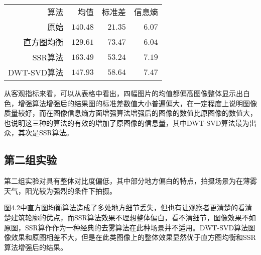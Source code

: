 \begin{table}[!htbp]
    \label{tab:sample}
    \centering
    \footnotesize%
    \setlength{\tabcolsep}{4pt}%
    \renewcommand{\arraystretch}{1.2}%
    \begin{tabular}{|r|r|r|r|}
	  \hline
        算法   			   & 均值 & 标准差 & 信息熵 \\
	   原始   			   & $140.48$ & $21.35$ & $6.07$ \\
        直方图均衡            & $129.61$ & $73.47$ & $6.04$ \\
        SSR算法			    & $163.49$ & $53.24$ & $7.19$ \\
        DWT-SVD算法       & $147.93$ & $58.64$ & $7.47$ \\
        \hline
    \end{tabular}
\end{table}


从客观指标来看，可以从表格中看出，四幅图片的均值都偏高图像整体显示出白色，增强算法增强后的结果图的标准差数值大小普遍偏大，在一定程度上说明图像质量较好，而在图像信息熵方面增强算法增强后的图像的数值比原图像的数值大，也说明这三种的算法的有效的增加了原图像的信息量，其中DWT-SVD算法最为出众，其次是SSR算法。

			\subsection{第二组实验}第二组实验对具有整体对比度偏低，其中部分地方偏白的特点，拍摄场景为在薄雾天气，阳光较为强烈的条件下拍摄。

图4.2中直方图均衡算法造成了多处地方细节丢失，但也有让观察者更清楚的看清楚建筑轮廓的优点，而SSR算法效果不理想整体偏白，看不清细节，图像效果不如原图，SSR算作作为一种经典的去雾算法在此种场景并不适用。DWT-SVD算法图像效果和原图相差不大，但是在此类图像上的整体效果显然优于直方图均衡和SSR算法增强后的结果。

